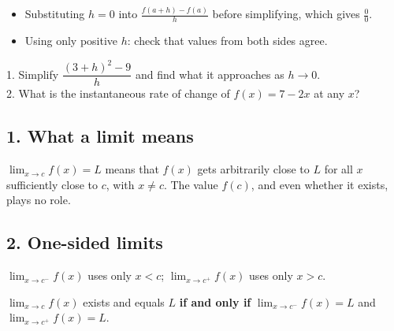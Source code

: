 \begin{mistakes}
\begin{itemize}
\item Substituting $h=0$ into $\frac{f(a+h)-f(a)}{h}$ before simplifying, which gives $\frac00$.
\item Using only positive $h$: check that values from both sides agree.
\end{itemize}
\end{mistakes}

\begin{quickcheck}
1. Simplify $\dfrac{(3+h)^2-9}{h}$ and find what it approaches as $h\to0$.\\
2. What is the instantaneous rate of change of $f(x)=7-2x$ at any $x$?
\end{quickcheck}


\subsection*{1. What a limit means}
\begin{keyidea}
$\displaystyle\lim_{x\to c}f(x)=L$ means that $f(x)$ gets arbitrarily close to $L$ for all $x$ sufficiently close to $c$, with $x\neq c$. The value $f(c)$, and even whether it exists, plays no role.
\end{keyidea}

\subsection*{2. One-sided limits}
$\displaystyle\lim_{x\to c^-}f(x)$ uses only $x<c$; $\displaystyle\lim_{x\to c^+}f(x)$ uses only $x>c$.
\begin{keyidea}[Existence]
$\displaystyle\lim_{x\to c}f(x)$ exists and equals $L$ \textbf{if and only if} $\displaystyle\lim_{x\to c^-}f(x)=L$ and $\displaystyle\lim_{x\to c^+}f(x)=L$.
\end{keyidea}

